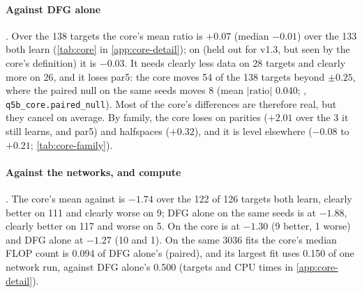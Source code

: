 \paragraph{Against DFG alone} . Over the 138 targets the core's mean ratio is $+0.07$ (median $-0.01$) over the 133 both learn (\cref{tab:core} in \cref{app:core-detail}); on  (held out for v1.3, but seen by the core's definition) it is $-0.03$. It needs clearly less data on 28 targets and clearly more on 26, and it loses par5: the core moves 54 of the 138 targets beyond $\pm0.25$, where the paired null on the same seeds moves 8 (mean $|\text{ratio}|$ 0.040; , \texttt{q5b\_core.paired\_null}). Most of the core's differences are therefore real, but they cancel on average. By family, the core loses on parities ($+2.01$ over the 3 it still learns, and par5) and halfspaces ($+0.32$), and it is level elsewhere ($-0.08$ to $+0.21$; \cref{tab:core-family}).

\paragraph{Against the networks, and compute} . The core's mean against  is $-1.74$ over the 122 of 126 targets both learn, clearly better on 111 and clearly worse on 9; DFG alone on the same seeds is at $-1.88$, clearly better on 117 and worse on 5. On  the core is at $-1.30$ (9 better, 1 worse) and DFG alone at $-1.27$ (10 and 1). On the same 3036 fits the core's median FLOP count is 0.094 of DFG alone's (paired), and its largest fit uses 0.150 of one network run, against DFG alone's 0.500 (targets and CPU times in \cref{app:core-detail}).

